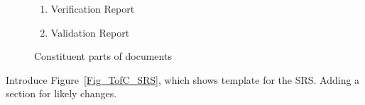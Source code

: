 \documentclass{elsarticle}
\begin{document}
\begin{figure}
{{\begin{minipage}{1.19\textwidth}
\begin{enumerate}
\item {Verification Report}

\item {Validation Report}

\end{enumerate}
\end{minipage}
}
}
\caption{Constituent parts of documents}
\label{Fig_BottomUpPieces}
\end{figure}

Introduce Figure~\ref{Fig_TofC_SRS}, which shows template for the  SRS.  Adding
a section for likely changes.
\end{document}
